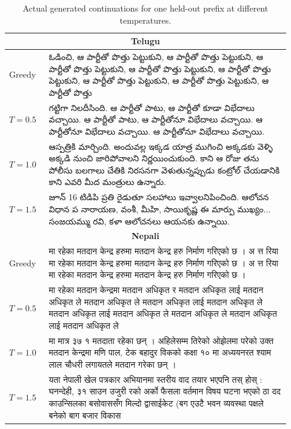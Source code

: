 \documentclass[10pt,a4paper]{article}
\begin{document}
\begin{table}[H]
\centering
\scriptsize
\begin{tabular}{p{0.13\linewidth}p{0.79\linewidth}}
\toprule
\multicolumn{2}{c}{\textbf{Telugu}}\\
\midrule
Greedy &
\telugufont ఓడించి, ఆ పార్టీతో పొత్తు పెట్టుకుని, ఆ పార్టీతో పొత్తు
పెట్టుకుని, ఆ పార్టీతో పొత్తు పెట్టుకుని, ఆ పార్టీతో పొత్తు పెట్టుకుని,
ఆ పార్టీతో పొత్తు పెట్టుకుని, ఆ పార్టీతో పొత్తు
పెట్టుకుని, ఆ పార్టీతో పొత్తు పెట్టుకుని, ఆ పార్టీతో పొత్తు
\\
$T=0.5$ &
\telugufont గట్టిగా నిలదీసింది. ఆ పార్టీతో పాటు, ఆ పార్టీతో కూడా
విభేదాలు వచ్చాయి. ఆ పార్టీతో పాటు, ఆ పార్టీతోనూ విభేదాలు వచ్చాయి.
ఆ పార్టీతోనూ విభేదాలు వచ్చాయి. ఆ పార్టీతోనూ విభేదాలు వచ్చాయి.
\\
$T=1.0$ &
\telugufont ఆస్పత్రికి మార్చింది. అందువల్ల ఇక్కడ యాత్ర ముగించి
అక్కడకు వెళ్ళి అక్కడి నుంచి జారిపోవాలని నిర్ణయించుకుంది. కాని ఆ రోజు
తను పోలీసు బలగాలు చేతికి నిరసనగా వెళుతున్నప్పుడు కంట్రోల్ చేయడానికి
కాని ఎవరి మీద మంత్రులు ఉన్నారు.
\\
$T=1.5$ &
\telugufont జూన్ 16 టిడిపి ప్రతి రైడుతూ సలహాలు ఇవ్వాలనిపించింది.
ఆలోచన విధాన ప నారాయణ, వంశీ, మీహి, సాయికృష్ణ ఈ మార్పు ముఖ్యం...
సంజయమ్ము రవి, కళా ఆలోచనలు ఆయనకు ఉన్నాయి.
\\
\midrule
\multicolumn{2}{c}{\textbf{Nepali}}\\
\midrule
Greedy &
\devanagarifont मा रहेका मतदान केन्द्र हरुमा मतदान केन्द्र हरु
निर्माण गरिएको छ । अ त्त रिया मा रहेका मतदान केन्द्र हरुमा मतदान
केन्द्र हरु निर्माण गरिएको छ । अ त्त रिया मा रहेका मतदान केन्द्र हरुमा
मतदान केन्द्र हरु निर्माण गरिएको छ ।
\\
$T=0.5$ &
\devanagarifont मा रहेका मतदान केन्द्रमा मतदान अधिकृत र मतदान
अधिकृत लाई मतदान अधिकृत ले मतदान अधिकृत ले मतदान अधिकृत लाई मतदान
अधिकृत ले मतदान अधिकृत लाई मतदान अधिकृत ले मतदान अधिकृत ले मतदान
अधिकृत लाई मतदान अधिकृत ले
\\
$T=1.0$ &
\devanagarifont मा मात्र ३७ १ मतदाता रहेका छन् । अहिलेसम्म तिरेको
ओझेलमा परेको उक्त मतदान केन्द्रमा मणि पाल, टेक बहादुर विकको कक्षा १०
मा अध्ययनरत श्याम लाल चौधरी लगायतले मतदान गरेका छन् ।
\\
$T=1.5$ &
\devanagarifont यता नेपाली खेल पत्रकार अभियानमा स्तरीय वाद तयार
भएपनि तस् होस् : घनन्देही, ३१ साउन उजुरी रको अर्को फैसला वर्तमान
विषय घटना भएको ठा दद काउन्सिलका बसोवाससँग मिल्दो द्वासाईकेट
(बग एउटै भवन व्यवस्था पक्षले बनेको बाग बजार विकास
\\
\bottomrule
\end{tabular}
\caption{Actual generated continuations for one held-out prefix at
different temperatures.}
\end{table}
\end{document}
